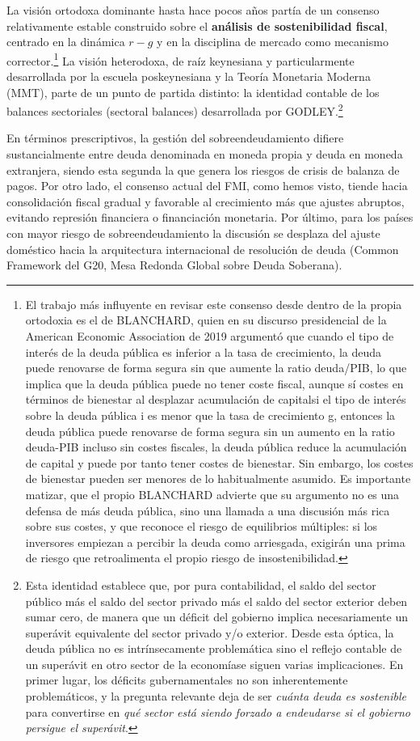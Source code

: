 \documentclass[10pt,a4paper]{article}
\begin{document}
La visión ortodoxa dominante hasta hace pocos años partía de un consenso relativamente estable construido sobre el \textbf{análisis de sostenibilidad fiscal}, centrado en la dinámica $r−g$ y en la disciplina de mercado como mecanismo corrector.\footnote{%
    El trabajo más influyente en revisar este consenso desde dentro de la propia ortodoxia es el de BLANCHARD, quien en su discurso presidencial de la American Economic Association de 2019 argumentó que cuando el tipo de interés de la deuda pública es inferior a la tasa de crecimiento, la deuda puede renovarse de forma segura sin que aumente la ratio deuda/PIB, lo que implica que la deuda pública puede no tener coste fiscal, aunque sí costes en términos de bienestar al desplazar acumulación de capitalsi el tipo de interés sobre la deuda pública i es menor que la tasa de crecimiento g, entonces la deuda pública puede renovarse de forma segura sin un aumento en la ratio deuda-PIB incluso sin costes fiscales, la deuda pública reduce la acumulación de capital y puede por tanto tener costes de bienestar. Sin embargo, los costes de bienestar pueden ser menores de lo habitualmente asumido. Es importante matizar, que el propio BLANCHARD advierte que su argumento no es una defensa de más deuda pública, sino una llamada a una discusión más rica sobre sus costes, y que reconoce el riesgo de equilibrios múltiples: si los inversores empiezan a percibir la deuda como arriesgada, exigirán una prima de riesgo que retroalimenta el propio riesgo de insostenibilidad.
} La visión heterodoxa, de raíz keynesiana y particularmente desarrollada por la escuela poskeynesiana y la Teoría Monetaria Moderna (MMT), parte de un punto de partida distinto: la identidad contable de los balances sectoriales (sectoral balances) desarrollada por GODLEY.\footnote{%
    Esta identidad establece que, por pura contabilidad, el saldo del sector público más el saldo del sector privado más el saldo del sector exterior deben sumar cero, de manera que un déficit del gobierno implica necesariamente un superávit equivalente del sector privado y/o exterior. Desde esta óptica, la deuda pública no es intrínsecamente problemática sino el reflejo contable de un superávit en otro sector de la economíase siguen varias implicaciones. En primer lugar, los déficits gubernamentales no son inherentemente problemáticos, y la pregunta relevante deja de ser \textit{cuánta deuda es sostenible} para convertirse en \textit{qué sector está siendo forzado a endeudarse si el gobierno persigue el superávit}.
}

En términos prescriptivos, la gestión del sobreendeudamiento difiere sustancialmente entre deuda denominada en moneda propia y deuda en moneda extranjera, siendo esta segunda la que genera los riesgos de crisis de balanza de pagos. Por otro lado, el consenso actual del FMI, como hemos visto, tiende hacia consolidación fiscal gradual y favorable al crecimiento más que ajustes abruptos, evitando represión financiera o financiación monetaria. Por último, para los países con mayor riesgo de sobreendeudamiento la discusión se desplaza del ajuste doméstico hacia la arquitectura internacional de resolución de deuda (Common Framework del G20, Mesa Redonda Global sobre Deuda Soberana).
\end{document}
